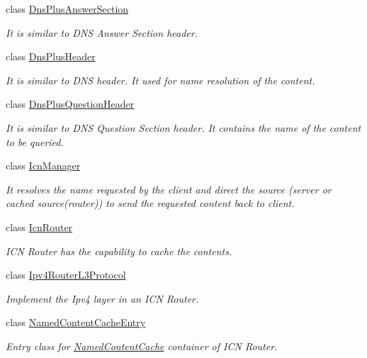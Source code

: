 \begin{DoxyCompactItemize}
class \hyperlink{classns3_1_1DnsPlusAnswerSection}{Dns\-Plus\-Answer\-Section}
\begin{DoxyCompactList}\small\item\em It is similar to D\-N\-S Answer Section header. \end{DoxyCompactList}\item 
class \hyperlink{classns3_1_1DnsPlusHeader}{Dns\-Plus\-Header}
\begin{DoxyCompactList}\small\item\em It is similar to D\-N\-S header. It used for name resolution of the content. \end{DoxyCompactList}\item 
class \hyperlink{classns3_1_1DnsPlusQuestionHeader}{Dns\-Plus\-Question\-Header}
\begin{DoxyCompactList}\small\item\em It is similar to D\-N\-S Question Section header. It contains the name of the content to be queried. \end{DoxyCompactList}\item 
class \hyperlink{classns3_1_1IcnManager}{Icn\-Manager}
\begin{DoxyCompactList}\small\item\em It resolves the name requested by the client and direct the source (server or cached source(router)) to send the requested content back to client. \end{DoxyCompactList}\item 
class \hyperlink{classns3_1_1IcnRouter}{Icn\-Router}
\begin{DoxyCompactList}\small\item\em I\-C\-N Router has the capability to cache the contents. \end{DoxyCompactList}\item 
class \hyperlink{classns3_1_1Ipv4RouterL3Protocol}{Ipv4\-Router\-L3\-Protocol}
\begin{DoxyCompactList}\small\item\em Implement the Ipv4 layer in an I\-C\-N Router. \end{DoxyCompactList}\item 
class \hyperlink{classns3_1_1NamedContentCacheEntry}{Named\-Content\-Cache\-Entry}
\begin{DoxyCompactList}\small\item\em Entry class for \hyperlink{classns3_1_1NamedContentCache}{Named\-Content\-Cache} container of I\-C\-N Router. \end{DoxyCompactList}\item 

\end{DoxyCompactItemize}
